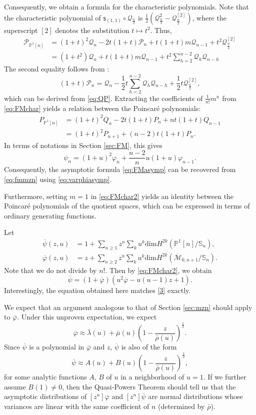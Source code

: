 \documentclass[11pt,letterpaper]{amsart}
\numberwithin{equation}{section}
\theoremstyle{definition}
\newcommand{\PP}{\mathbb{P}}
\newcommand{\cal}{\mathcal}
\def\cM{{\cal M}}
\def\cQ{{\cal Q}}
\def\mzno{\overline{\cM}_{0,n+1} }
\def\dim{\mathrm{dim} }
\def\beq{\begin{equation}}
\def\eeq{\end{equation}}
\def\sfs{\mathsf{s}}
\def\charP{\mathscr{P}}
\def\charQ{\mathscr{Q}}
\def\symS{\mathbb{S}}
\begin{document}
Consequently, we obtain a formula for the characteristic polynomials. Note that the characteristic polynomial of $\sfs_{(1,1)}\circ  \cQ_{\frac{n}{2}}$ is $\frac{1}{2} (\charQ_{\frac{n}{2}}^2 -\charQ_{\frac{n}{2}}^{[2]} )$, where the superscript $[2]$ denotes the substitution $t\mapsto t^2$. Thus,
\begin{align}
\charP_{\PP^1[n]} &=  (1+t)^2\charQ_n -2t(1+t)\charP_n + t(1+t) m \charQ_{n-1}+ t^2
\charQ_{\frac{n}{2}}^{[2]} \label{eq:FMchar} \\
&= (1+t^2)\charQ_n + t(1+t)m \charQ_{n-1}+ t^2\sum_{h=2}^{n-2}
\charQ_{h}\charQ_{n-h}  \label{eq:FMchar2}
\end{align}
The second equality follows from \cite[Corollary 5.12]{CKL1}:
\[(1+t)\charP_n=\charQ_n - \frac{1}{2}t \sum_{h=2}^{n-2}
\charQ_{h}\charQ_{n-h} + \frac{1}{2}t \charQ_{\frac{n}{2}}^{[2]},\]
which can be derived from \eqref{eq:QP}.
Extracting the coefficients of $\frac{1}{n!}m^n$ from \eqref{eq:FMchar} yields a relation between the Poincar\'e polynomials:
\begin{align*}
P_{\PP^1[n]} & =  (1+t)^2 Q_n -2t(1+t) P_n  + nt(1+t) Q_{n-1} \\
&= (1+t)^2 P_{n+1} +(n-2)t(1+t) P_n .
\end{align*}
In terms of notations in Section \ref{sec:FM}, this gives
\beq \label{eq:fmmzn}\psi_n = (1+u)^2\varphi_n + \frac{n-2}{n}u(1+u) \varphi_{n-1}. \eeq
Consequently, the asymptotic formula \eqref{eq:FMasymp} can be recovered from \eqref{eq:fmmzn} using \eqref{eq:varphiasymp}.

Furthermore, setting $m=1$ in \eqref{eq:FMchar2} yields an identity between the Poincar\'e polynomials of the quotient spaces, which can be expressed in terms of ordinary generating functions.

Let
\begin{align*} \overline{\psi}(z,u)&=1+\sum_{n\ge 1} z^n \sum_k u^k\dim H^{2k}(\PP^1[n]/\symS_n), \\
 \overline{\varphi}(z,u)&=z+\sum_{n\ge 2} z^n \sum_k u^k\dim H^{2k}(\mzno/\symS_n).\end{align*}
Note that we do not divide by $n!$. Then by \eqref{eq:FMchar2}, we obtain
\beq
\overline{\psi}= (1+\overline{\varphi})(u^2 \overline{\varphi} -u(u-1)z +1).
\eeq
Interestingly, the equation obtained here matches \eqref{3} exactly.

We expect that an argument analogous to that of Section \ref{sec:mzn} should apply to $\overline{\varphi}$. Under this unproven expectation, we expect
\[\overline{\varphi} \approx \bar\lambda(u) +\bar\mu(u) \left(1-\frac{z}{\bar\rho(u)}\right)^\frac12. \]
Since $ \overline{\psi}$ is a polynomial in $\overline{\varphi}$ and $z$, $ \overline{\psi}$ is also of the form
\[\overline{\psi} \approx A(u) +B(u) \left(1-\frac{z}{\bar\rho(u)}\right)^\frac12, \]
for some analytic functions $A$, $B$ of $u$ in a neighborhood of $u=1$. If we further assume $B(1)\ne 0$, then the Quasi-Powers Theorem should tell us that
the asymptotic distributions of $[z^n]\overline{\varphi}$ and $[z^n]\overline{\psi}$ are normal distributions whose variances are linear with the same coefficient of $n$ (determined by $\bar\rho$).
\end{document}
